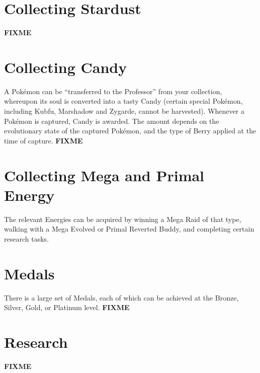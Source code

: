 \section{Collecting Stardust}
\textbf{FIXME}

\section{Collecting Candy}
A Pokémon can be ``transferred to the Professor'' from your collection,
 whereupon its soul is converted into a tasty Candy (certain special
 Pokémon, including Kubfu, Marshadow and Zygarde, cannot be harvested).
Whenever a Pokémon is captured, Candy is awarded. The amount depends on
 the evolutionary state of the captured Pokémon, and the type of Berry
 applied at the time of capture.
\textbf{FIXME}

\section{Collecting Mega and Primal Energy}
The relevant Energies can be acquired by winning a Mega Raid of that type,
  walking with a Mega Evolved or Primal Reverted Buddy, and completing
  certain research tasks.

\section{Medals}
There is a large set of Medals, each of which can be achieved at the Bronze,
 Silver, Gold, or Platinum level.
\textbf{FIXME}

\section{Research}
\label{section:research}
\textbf{FIXME}
